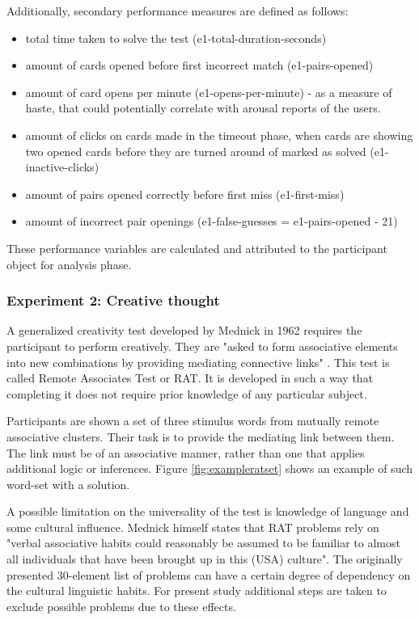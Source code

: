 		Additionally, secondary performance measures are defined as follows:
		
		\begin{itemize}
			\item total time taken to solve the test (e1-total-duration-seconds)
			\item amount of cards opened before first incorrect match (e1-pairs-opened)
			\item amount of card opens per minute (e1-opens-per-minute) - as a measure of haste, that could potentially correlate with arousal reports of the users.
			\item amount of clicks on cards made in the timeout phase, when cards are showing two opened cards before they are turned around of marked as solved (e1-inactive-clicks)
			\item amount of pairs opened correctly before first miss (e1-first-miss)
			\item amount of incorrect pair openings (e1-false-guesses = e1-pairs-opened - 21)
		\end{itemize}
	
		These performance variables are calculated and attributed to the participant object for analysis phase.
		
		\subsubsection{Experiment 2: Creative thought} \label{sec:creativity}
		
		A generalized creativity test developed by Mednick \cite{Mednick1962} in 1962 requires the participant to perform creatively. They are "asked to form associative elements into new combinations by providing mediating connective links" \cite[p. 226]{Mednick1962}. This test is called Remote Associates Test or RAT.
		It is developed in such a way that completing it does not require prior knowledge of any particular subject. 
		
		Participants are shown a set of three stimulus words from mutually remote associative clusters. Their task is to provide the mediating link between them. The link must be of an associative manner, rather than one that applies additional logic or inferences. Figure \ref{fig:exampleratset} shows an example of such word-set with a solution.
		
		A possible limitation on the universality of the test is knowledge of language and some cultural influence. Mednick himself states that RAT problems rely on "verbal associative habits could reasonably be assumed to be familiar to almost all individuals that have been brought up in this (USA) culture". The originally presented 30-element list of problems can have a certain degree of dependency on the cultural linguistic habits. For present study additional steps are taken to exclude possible problems due to these effects. 
		
